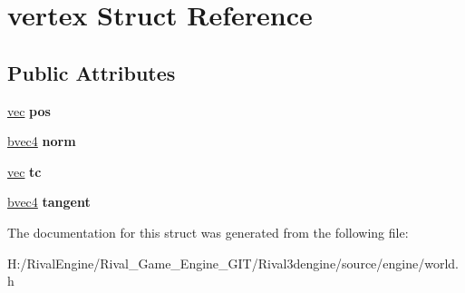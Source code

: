 \hypertarget{structvertex}{}\section{vertex Struct Reference}
\label{structvertex}
\subsection*{Public Attributes}
\begin{DoxyCompactItemize}
\item 
\mbox{\label{structvertex_a8358b958847a9d0c27a4583c6a0bb036}} 
\hyperlink{structvec}{vec} {\bfseries pos}
\item 
\mbox{\label{structvertex_a952d83be652aec524c8d9fe05bc0824b}} 
\hyperlink{structbvec4}{bvec4} {\bfseries norm}
\item 
\mbox{\label{structvertex_af83967470da3408ffde3c7957f5ad890}} 
\hyperlink{structvec}{vec} {\bfseries tc}
\item 
\mbox{\label{structvertex_a086b80055b3bf03e0346f7c5756ab29d}} 
\hyperlink{structbvec4}{bvec4} {\bfseries tangent}
\end{DoxyCompactItemize}


The documentation for this struct was generated from the following file\+:\begin{DoxyCompactItemize}
\item 
H\+:/\+Rival\+Engine/\+Rival\+\_\+\+Game\+\_\+\+Engine\+\_\+\+G\+I\+T/\+Rival3dengine/source/engine/world.\+h\end{DoxyCompactItemize}
